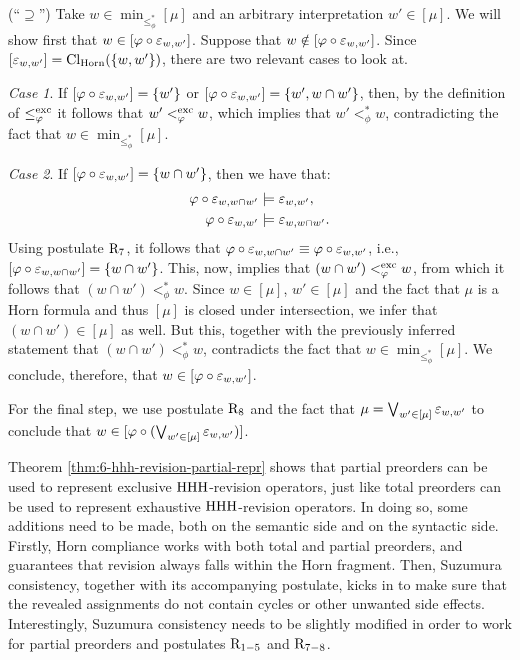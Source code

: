 \begin{prf*}{}{}
	(``$\supseteq$'')
	Take $w\in\min_{\le^{\ast}_{\phi}}[\mu]$ and an arbitrary interpretation 
	$w'\in[\mu]$. We will show first that $w\in[\varphi\circ\varepsilon_{w,w'}]$.
	Suppose that $w\notin[\varphi\circ\varepsilon_{w,w'}]$.
	Since $[\varepsilon_{w,w'}]={\operatorname{Cl}}_{\mathrm{Horn}}(\{w,w'\})$,
	there are two relevant cases to look at.

	\emph{Case 1}.
	If $[\varphi\circ\varepsilon_{w,w'}]=\{w'\}$ or $[\varphi\circ\varepsilon_{w,w'}]=\{w',w\cap w'\}$,
	then, by the definition of $\le^{{\operatorname{exc}}}_{\varphi}$
	it follows that $w'<^{{\operatorname{exc}}}_{\varphi}w$,
	which implies that $w'<^{\ast}_{\phi}w$,
	contradicting the fact that $w\in\min_{\le^{\ast}_{\phi}}[\mu]$.

	\emph{Case 2}.
	If $[\varphi\circ\varepsilon_{w,w'}]=\{w\cap w'\}$, then we have that:
	\begin{align*}
		\varphi\circ\varepsilon_{w,w\cap w'} &\models \varepsilon_{w,w'},\\
		\varphi\circ\varepsilon_{w,w'} &\models \varepsilon_{w,w\cap w'}.
	\end{align*}
	Using postulate $\mathrm{R}_{7}$, 
	it follows that 
	$\varphi\circ\varepsilon_{w,w\cap w'}\equiv \varphi\circ\varepsilon_{w,w'}$,
	i.e., $[\varphi\circ\varepsilon_{w,w\cap w'}]=\{w\cap w'\}$.
	This, now, implies that $(w\cap w')<^{{\operatorname{exc}}}_{\varphi} w$,
	from which it follows that $(w\cap w')<^{\ast}_{\phi}w$.
	Since $w\in[\mu]$, $w'\in[\mu]$
	and the fact that $\mu$ is a Horn formula and 
	thus $[\mu]$ is closed under intersection, 
	we infer that $(w\cap w')\in[\mu]$ as well.
	But this, together with the previously inferred 
	statement that $(w\cap w')<^{\ast}_{\phi}w$,
	contradicts the fact that $w\in\min_{\le^{\ast}_{\phi}}[\mu]$.
	We conclude, therefore, that $w\in[\varphi\circ\varepsilon_{w,w'}]$.

	For the final step, we use postulate $\mathrm{R}_{8}$
	and the fact that $\mu=\bigvee_{w'\in[\mu]}\varepsilon_{w,w'}$
	to conclude that $w\in[\varphi\circ(\bigvee_{w'\in[\mu]}\varepsilon_{w,w'})]$.
\end{prf*}

Theorem \ref{thm:6-hhh-revision-partial-repr} shows that 
partial preorders can be used to represent exclusive 
${\mathrm{HHH}}$-revision operators, just like total preorders can be used to 
represent exhaustive ${\mathrm{HHH}}$-revision operators.
In doing so, some additions need to be made, both on the semantic side
and on the syntactic side. Firstly, Horn compliance 
works with both total and partial preorders, and guarantees that 
revision always falls within the Horn fragment.
Then, Suzumura consistency, together with its accompanying postulate,
kicks in to make sure that the revealed assignments do not contain cycles
or other unwanted side effects. Interestingly, Suzumura consistency needs 
to be slightly modified in order to work for partial preorders and postulates 
$\mathrm{R}_{1-5}$ and $\mathrm{R}_{7-8}$.









